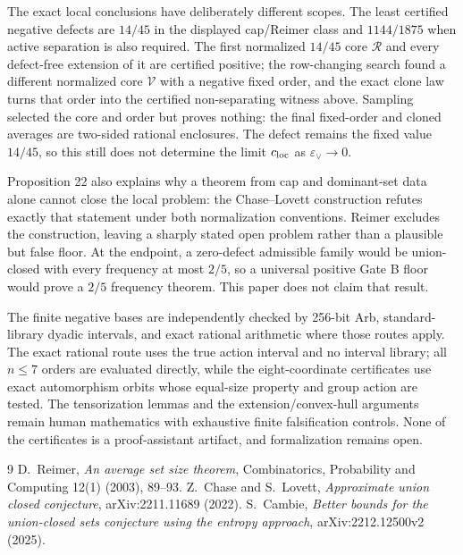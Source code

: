 \documentclass[11pt]{article}
\theoremstyle{remark}
\newcommand{\eps}{\varepsilon}
\begin{document}
The exact local conclusions have deliberately different scopes.  The least
certified negative defects are \(14/45\) in the displayed cap/Reimer class and
\(1144/1875\) when active separation is also required.  The first normalized
\(14/45\) core \(\mathcal R\) and every defect-free extension of it are
certified positive; the row-changing search found a different normalized core
\(\mathcal V\) with a negative fixed order, and the exact clone law turns that
order into the certified non-separating witness above.  Sampling selected the
core and order but proves nothing: the final fixed-order and cloned averages are
two-sided rational enclosures.  The defect remains the fixed value \(14/45\),
so this still does not determine the limit \(c_{\rm loc}\) as
\(\eps_\vee\to0\).

Proposition 22 also explains why a theorem from cap and dominant-set data alone
cannot close the local problem: the Chase--Lovett construction refutes exactly
that statement under both normalization conventions.  Reimer excludes the
construction, leaving a sharply stated open problem rather than a plausible
but false floor.  At the endpoint, a zero-defect admissible family would be
union-closed with every frequency at most \(2/5\), so a universal positive
Gate B floor would prove a \(2/5\) frequency theorem.  This paper does not claim
that result.

The finite negative bases are independently checked by 256-bit Arb,
standard-library dyadic intervals, and exact rational arithmetic where those
routes apply.  The exact rational route uses the true action interval and no
interval library; all \(n\le7\) orders are evaluated directly, while the
eight-coordinate certificates use exact automorphism orbits whose equal-size
property and group action are tested.  The tensorization lemmas and the
extension/convex-hull arguments remain human mathematics with exhaustive
finite falsification controls.  None of the certificates is a proof-assistant
artifact, and formalization remains open.

\begin{thebibliography}{9}
D.~Reimer,
\emph{An average set size theorem},
Combinatorics, Probability and Computing 12(1) (2003), 89--93.
Z.~Chase and S.~Lovett,
\emph{Approximate union closed conjecture},
arXiv:2211.11689 (2022).
S.~Cambie,
\emph{Better bounds for the union-closed sets conjecture using the entropy approach},
arXiv:2212.12500v2 (2025).
\end{thebibliography}
\end{document}
